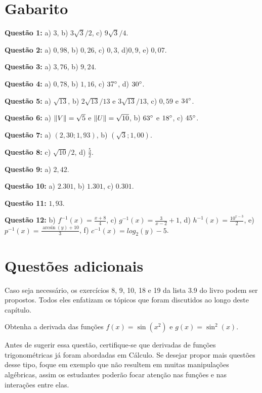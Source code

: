 \documentclass[main_estudante.tex]{subfiles}
\begin{document}
\section{Gabarito}

\noindent\textbf{Questão 1:} a) $3$, b) $3\sqrt{3}/2$, c) $9\sqrt{3}/4$.

\noindent\textbf{Questão 2:} a) $0,98$, b) $0,26$, c) $0,3$, d)$0,9$, e) $0,07$.

\noindent\textbf{Questão 3:} a) $3,76$, b) $9,24$.

\noindent\textbf{Questão 4:} a) $0,78$, b) $1,16$, c) $37\degree$, d) $30\degree$.

\noindent\textbf{Questão 5:} a) $\sqrt{13}$, b) $2\sqrt{13}/13$ e $3\sqrt{13}/13$, c) $0,59$ e $34\degree$.

\noindent\textbf{Questão 6:} a) $\Arrowvert V \Arrowvert = \sqrt{5}$ e $\Arrowvert U \Arrowvert = \sqrt{10}$, b) $63\degree$ e $18\degree$, c) $45\degree$.

\noindent\textbf{Questão 7:} a) $(2,30;1,93)$, b) $(\sqrt{3};1,00)$.

\noindent\textbf{Questão 8:} c) $\sqrt{10}/2$, d) $\frac{5}{2}$.

\noindent\textbf{Questão 9:} a) $2,42$.

\noindent\textbf{Questão 10:} a) $2.301$, b) $1.301$, c) $0.301$.

\noindent\textbf{Questão 11:} $1,93$.

\noindent\textbf{Questão 12:} b) $f^{-1}(x)=\frac{x+8}{4}$, c) $g^{-1}(x)=\frac{3}{x-2}+1$, d) $h^{-1}(x)=\frac{10^{x-3}}{2}$, e) $p^{-1}(x)=\frac{\arcsin(y)+10}{3}$, f) $c^{-1}(x)=log_2 (y)-5$.

\section{Questões adicionais}

Caso seja necessário, os exercícios 8, 9, 10, 18 e 19 da lista 3.9 do livro  podem ser propostos. Todos eles enfatizam os tópicos que foram discutidos ao longo deste capítulo.

\begin{adicional}
Obtenha a derivada das funções $f(x)=\sin(x^2)$ e $g(x)=\sin^2(x)$.
\end{adicional}

Antes de sugerir essa questão, certifique-se que derivadas de funções trigonométricas já foram abordadas em Cálculo. Se desejar propor mais questões desse tipo, foque em exemplo que não resultem em muitas manipulações algébricas, assim os estudantes poderão focar atenção nas funções e nas interações entre elas.
\end{document}
